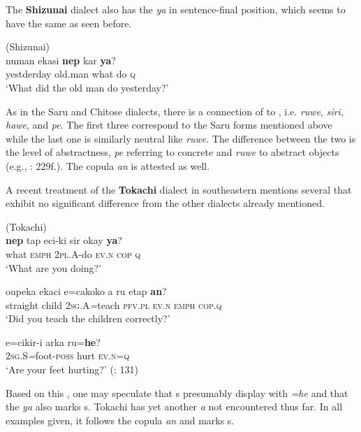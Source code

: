 The \textbf{Shizunai} dialect also has the  \textit{ya} in sentence-final position, which seems to have the same  as seen before.

\ea%
    \label{ex:ainu:16}
     (Shizunai)\\
    \gll numan    ekasi \textbf{{nep}} kar \textbf{{ya}}?\\
    yestderday  old.man  what  do  \textsc{q}\\
    \glt ‘What did the old man do yesterday?’ \citep[229]{Refsing1986}
    \z

As in the Saru and Chitose dialects, there is a connection of  to , i.e. \textit{ruwe}, \textit{siri}, \textit{hawe}, and \textit{pe}. The first three correspond to the Saru forms mentioned above while the last one is similarly neutral like \textit{ruwe}. The difference between the two is the level of abstractness, \textit{pe} referring to concrete and \textit{ruwe} to abstract objects (e.g., \citealt{Refsing1986}: 229f.). The copula \textit{an} is attested as well.

A recent treatment of the \textbf{Tokachi} dialect in southeastern  mentions several  that exhibit no significant difference from the other dialects already mentioned.

\newpage 
\ea%
    \label{ex:ainu:17}
     (Tokachi)\\
    \ea
    \gll \textbf{{nep}} tap eci-ki sir okay \textbf{{ya}}?\\
    what  \textsc{emph}  2\textsc{pl}.A-do  \textsc{ev.n}  \textsc{cop}  \textsc{q}\\
    \glt ‘What are you doing?’

    \ex
    \gll oupeka ekaci e={cakoko} a ru etap \textbf{{an}}?\\
    straight    child  2\textsc{sg}.A\textit{=}teach  \textsc{pfv.pl}  \textsc{ev.n}  \textsc{emph}  \textsc{cop.q}\\
    \glt ‘Did you teach the children correctly?’

    \ex
    \gll e={cikir-i} arka ru=\textbf{{he}}?\\
    2\textsc{sg}.S\textit{=}foot-\textsc{poss}  hurt  \textsc{ev.n=q}\\
    \glt ‘Are your feet hurting?’ (\citealt{Takahashi2013}: 131)
    \z
    \z 

Based on this , one may speculate that s presumably display  with \textit{=he} and that the  \textit{ya} also marks s. Tokachi  has yet another  \textit{a} not encountered thus far. In all examples given, it follows the copula \textit{an} and marks s.

